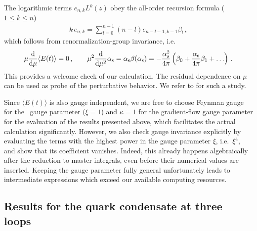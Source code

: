 The logarithmic terms $e_{n,k}L^k(z)$ obey the all-order recursion
formula ($1\leq k\leq n$)
\begin{equation}
  \begin{split}
    k\,e_{n,k} = \sum_{l=0}^{n-1}(n-l)e_{n-l-1,k-1}\beta_l\,,
  \end{split}
\end{equation}
which follows from renormalization-group invariance, i.e.
\begin{equation}
  \begin{split}
    \mu\frac{{\rm d} }{{\rm d} \mu}\langle E(t)\rangle = 0\,,\qquad
    \mu^2\frac{{\rm d} }{{\rm d} \mu^2}\alpha_\mathrm{s} = \alpha_\mathrm{s}\beta(\alpha_\mathrm{s}) =
    -\frac{\alpha^2_s}{4\pi}\left(\beta_0 + \frac{\alpha_\mathrm{s}}{4\pi}\beta_1
    + \ldots\right)\,.
    \label{eq:rgee}
  \end{split}
\end{equation}
This provides a welcome check of our calculation.  The residual
dependence on $\mu$ can be used as probe of the perturbative behavior.
We refer to  for such a study.

Since $\langle E(t) \rangle$ is also gauge independent, we are free to
choose Feynman gauge for the \qcd\ gauge parameter ($\xi=1$) and $\kappa = 1$ for the gradient-flow gauge parameter
for the evaluation of the results
presented above, which facilitates the actual calculation
significantly. However, we also check gauge invariance explicitly by
evaluating the terms with the highest power in the gauge parameter
$\xi$, i.e.\ $\xi^4$, and show that its coefficient vanishes. Indeed,
this already happens algebraically after the reduction to master
integrals, even before their numerical values are inserted.  Keeping the
gauge parameter fully general unfortunately leads to intermediate
expressions which exceed our available computing resources.

\subsection{Results for the quark condensate at three loops}

